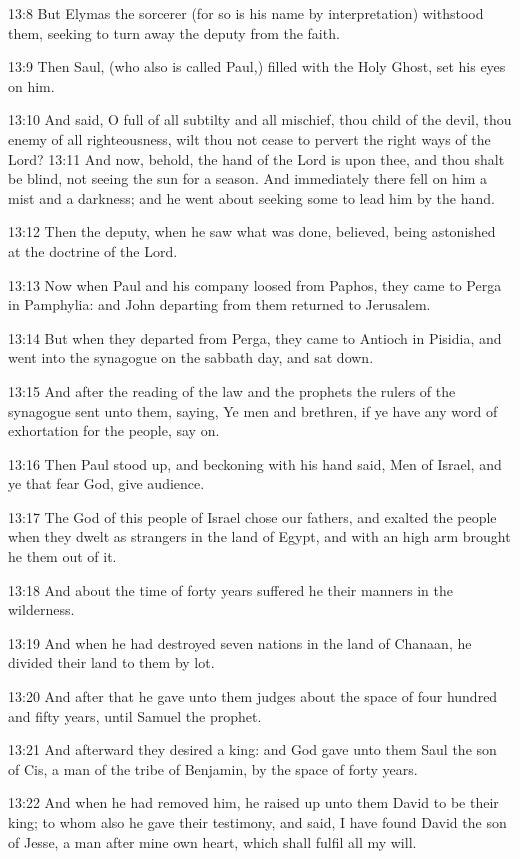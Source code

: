 13:8 But Elymas the sorcerer (for so is his name by interpretation)
withstood them, seeking to turn away the deputy from the faith.

13:9 Then Saul, (who also is called Paul,) filled with the Holy Ghost,
set his eyes on him.

13:10 And said, O full of all subtilty and all mischief, thou child of
the devil, thou enemy of all righteousness, wilt thou not cease to
pervert the right ways of the Lord?  13:11 And now, behold, the hand
of the Lord is upon thee, and thou shalt be blind, not seeing the sun
for a season. And immediately there fell on him a mist and a darkness;
and he went about seeking some to lead him by the hand.

13:12 Then the deputy, when he saw what was done, believed, being
astonished at the doctrine of the Lord.

13:13 Now when Paul and his company loosed from Paphos, they came to
Perga in Pamphylia: and John departing from them returned to
Jerusalem.

13:14 But when they departed from Perga, they came to Antioch in
Pisidia, and went into the synagogue on the sabbath day, and sat down.

13:15 And after the reading of the law and the prophets the rulers of
the synagogue sent unto them, saying, Ye men and brethren, if ye have
any word of exhortation for the people, say on.

13:16 Then Paul stood up, and beckoning with his hand said, Men of
Israel, and ye that fear God, give audience.

13:17 The God of this people of Israel chose our fathers, and exalted
the people when they dwelt as strangers in the land of Egypt, and with
an high arm brought he them out of it.

13:18 And about the time of forty years suffered he their manners in
the wilderness.

13:19 And when he had destroyed seven nations in the land of Chanaan,
he divided their land to them by lot.

13:20 And after that he gave unto them judges about the space of four
hundred and fifty years, until Samuel the prophet.

13:21 And afterward they desired a king: and God gave unto them Saul
the son of Cis, a man of the tribe of Benjamin, by the space of forty
years.

13:22 And when he had removed him, he raised up unto them David to be
their king; to whom also he gave their testimony, and said, I have
found David the son of Jesse, a man after mine own heart, which shall
fulfil all my will.


